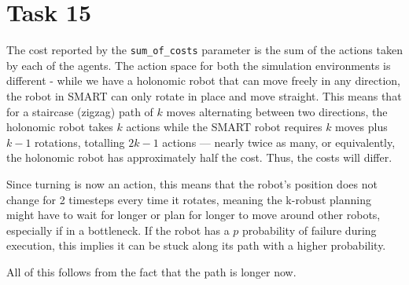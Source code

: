 \documentclass[11pt]{article}
\begin{document}
\section*{Task 15}
    The cost reported by the \texttt{sum\_of\_costs} parameter is the sum of the actions taken by each of the agents.
    The action space for both the simulation environments is different - while we have a holonomic robot that can move freely in any direction, the robot in SMART can only rotate in place and move straight.
    This means that for a staircase (zigzag) path of $k$ moves alternating between two directions, the holonomic robot takes $k$ actions while the SMART robot requires $k$ moves plus $k-1$ rotations, totalling $2k-1$ actions --- nearly twice as many, or equivalently, the holonomic robot has approximately half the cost.
    Thus, the costs will differ.

    Since turning is now an action, this means that the robot's position does not change for 2 timesteps every time it rotates,
    meaning the k-robust planning might have to wait for longer or plan for longer to move around other robots, especially if in a bottleneck.
    If the robot has a $p$ probability of failure during execution, this implies it can be stuck along its path with a higher probability.

    All of this follows from the fact that the path is longer now.
\end{document}
